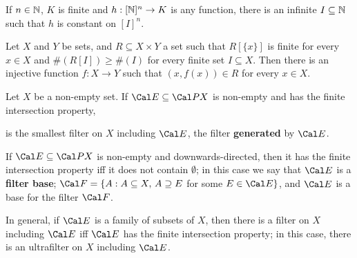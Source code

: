  If $n\in\Bbb N$, $K$ is finite and
$h:[\Bbb N]^n\to K$ is any function, there is an infinite
$I\subseteq\Bbb N$ such that $h$ is constant on $[I]^n$.

 Let $X$ and $Y$ be sets, and
$R\subseteq X\times Y$ a set such that $R[\{x\}]$ is finite for every
$x\in X$ and
$\#(R[I])\ge\#(I)$ for every finite set $I\subseteq X$.   Then there
is an injective function $f:X\to Y$ such that $(x,f(x))\in R$ for every
$x\in X$.


 Let $X$ be a non-empty set.
If $\Cal E\subseteq\Cal PX$ is non-empty
and has the finite intersection property,


\noindent is the smallest filter on $X$ including $\Cal E$, the filter
{\bf generated} by $\Cal E$.

If $\Cal E\subseteq\Cal PX$ is non-empty and
downwards-directed, then it has the finite intersection property iff
it does not contain $\emptyset$;  in this case we say that $\Cal E$ is a
{\bf filter base};
$\Cal F=\{A:A\subseteq X,\,A\supseteq E$ for some $E\in\Cal E\}$, and
$\Cal E$ is a base for the filter $\Cal F$.

In general, if $\Cal E$ is a family of subsets of $X$,
then there is a filter on $X$ including
$\Cal E$ iff $\Cal E$ has the finite intersection property;  in this
case, there is an ultrafilter on $X$ including
$\Cal E$.


